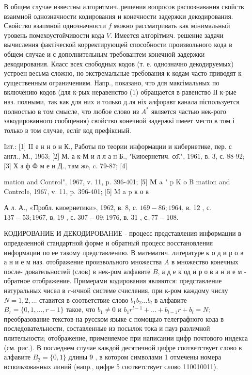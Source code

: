 \documentclass[10pt]{article}
\begin{document}
В общем случае известны алгоритмич. решения вопросов распознавания свойств взаимной однозначности кодирования и конечности задержки декодирования. Свойство взапмной однозначности $f$ можно рассматривать как мінимальный уровень помехоустойчивости кода $V$. Имеется алгорітмич. решение задачи вычисления фактіческой корректирующей способности произвольного кода в общем случае и с дополнительным требовантем конечной задержки декодирования. Класс всех свободных кодов (т. е. однозначно декодируемых) устроен весьма сложно, но экстремальные требования к кодам часто приводят к существенным ограничениям. Напр., показано, что для максімальных по включению кодов (для к-рых неравенство (1) обращается в равенство ІІ к-рые наз. полными, так как для них и только д.ля ніх алфоравт канала піспользуется полностью в том смысле, что любое слово из $A^{*}$ является частью нек-рого закодированного сообщения) свойство конечной задержкі пмеет место в том і только в том случае, есліг код префіксный.



Іит.: [1] II е н н о н К., Работы по теории информации и кибернетике, пер. с англ., М., 1963; [2] М. а к-М и л л а н Б., "Киюернетич. со̄.", 1961, в. 3, с. 88-92; [3] Х а ф Ф м е н Д., там жe, c. 79-87; [4]

mation and Control", 1967, v. 11, p. 396-401; [5] $\mathbf{M}$ a " p K o B mation and Control», 1967, v. 11, p. 396-401; [5] M a p к о в

А л. А., «Пробл. киоернетики», 1962, в. 8, с. $169-86 ; 1964$, в. 12 , с. $137-53 ; 1967$, в. 19 , с. $307-09 ; 1976$, в. 31 , с. $77-108$.



КОДИРОВАНИЕ И ДЕКОДИРОВАНИЕ - процесс представления информации в определенной стандартной форме и обратный процесс восстановления информации по ее такому представлению. В математич. литературе к о д и р о в а н и е м наз. отображение произвольного множества $A$ в множество конечных после- довательностей (слов) в нек-ром алфавите $B$, а д е к од и р о в а н и е м - обратное отображение. Примерами кодирования являются: представление натуральных чисел в $r$-ичной системе счисления, при к-ром каждому числу $N=1,2, \ldots$ ставится в соответствие слово $b_{1} b_{2} \ldots b_{l}$ в алфавите $B_{r}=\{0,1, \ldots, r-1\}$ такое, что $b_{1} \neq 0$ и $b_{1} r^{l-1}+\ldots+b_{l-1} r+b_{l}=N$; преобразование текстов на русском языке с помощью телеграфного кода в последовательности, составленные из посылок тока и пауз различной плительности; отображение, применяемое при написании цифр почтового индекса (см. рис.). В последнем случае каждой десятичной цифре соответствует слово в алфавите $B_{2}=\{0,1\}$ длины 9 , в котором символами 1 отмечены номера использованных линий (напр., цифре 5 соответствует слово 110010011).
\end{document}
